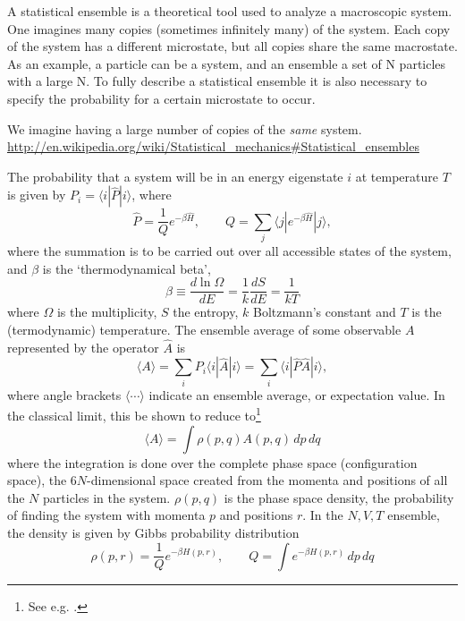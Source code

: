 \documentclass[11pt,bibliography=totoc,index=totoc]{scrbook}   %
\begin{document}
A statistical ensemble is a theoretical tool used to analyze a macroscopic system. One imagines many copies (sometimes infinitely many) of the system. Each copy of the system has a different microstate, but all copies share the same macrostate. As an example, a particle can be a system, and an ensemble a set of N particles with a large N.
To fully describe a statistical ensemble it is also necessary to specify the probability for a certain microstate to occur.


We imagine having a large number of copies of the \emph{same} system. 
\url{http://en.wikipedia.org/wiki/Statistical_mechanics#Statistical_ensembles}


The probability that a system will be in an energy eigenstate $i$ at temperature $T$ is 
given by $P_i=\langle i | \hat{P} | i \rangle$, where
\begin{equation}
  \hat{P} = \frac{1}{Q} e^{-\beta\hat{H}}, \qquad Q = \sum_j \langle j | e^{-\beta\hat{H}} | j \rangle,
\end{equation}
where the summation is to be carried out over all accessible states of the system, and
$\beta$ is the `thermodynamical beta',
\begin{equation}
  \beta \equiv \frac{d\ln\Omega}{dE} = \frac{1}{k}\frac{dS}{dE} = \frac{1}{kT}
\end{equation}
where $\Omega$ is the multiplicity, $S$ the entropy, $k$ Boltzmann's constant and $T$ is the (termodynamic) temperature. 
The ensemble average of some observable $A$ represented by the operator $\hat{A}$ is
\begin{equation}
  \langle A \rangle = \sum_i P_i \langle i | \hat{A} | i\rangle = \sum_i \langle i | \hat{P} \hat{A} | i \rangle,
\end{equation}
where angle brackets $\langle \cdots \rangle$ indicate an ensemble average, or expectation value.
In the classical limit, this be shown to reduce to\footnote{See e.g. \cite[13-15]{Frenkel:1996}.}
\begin{equation}
  \langle A \rangle = \int \rho(p,q) A(p,q)\,dp\,dq 
  \label{eq:configuration-int}
\end{equation}
where the integration is done over the complete phase space (configuration space), the $6N$-dimensional space created from the momenta and positions of all the $N$ particles in the system. $\rho(p,q)$ is the phase space density, the probability of finding the system with momenta $p$ and positions $r$. In the $N,V,T$ ensemble, the density is given by Gibbs probability distribution
\begin{equation}
  \rho(p,r) = \frac{1}{Q} e^{-\beta H(p,r)},\qquad Q = \int e^{-\beta H(p,r)} \,dp\,dq
\end{equation}
\end{document}
